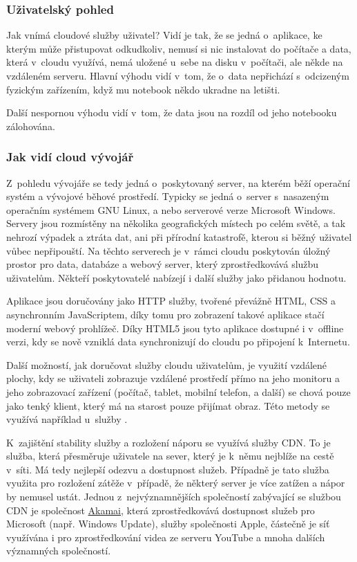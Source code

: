 \subsubsection{Uživatelský pohled}
Jak vnímá cloudové služby uživatel? Vidí je tak, že se jedná o~aplikace, ke kterým může přistupovat odkudkoliv, nemusí si nic instalovat do počítače a data, která v~cloudu využívá, nemá uložené u~sebe na disku v~počítači, ale někde na vzdáleném serveru. Hlavní výhodu vidí v~tom, že o~data nepřichází s~odcizeným fyzickým zařízením, když mu notebook někdo ukradne na letišti.

Další nespornou výhodu vidí v~tom, že data jsou na rozdíl od jeho notebooku zálohována.

\subsubsection{Jak vidí cloud vývojář}
Z~pohledu vývojáře se tedy jedná o~poskytovaný server, na kterém běží operační systém a vývojové běhové prostředí. Typicky se jedná o~server s~nasazeným operačním systémem GNU Linux, a nebo serverové verze Microsoft Windows. Servery jsou rozmístěny na několika geografických místech po celém světě, a tak nehrozí výpadek a ztráta dat, ani při přírodní katastrofě, kterou si běžný uživatel vůbec nepřipouští. Na těchto serverech je v~rámci cloudu poskytován úložný prostor pro data, databáze a webový server, který zprostředkovává službu uživatelům. Někteří poskytovatelé nabízejí i další služby jako přidanou hodnotu.

Aplikace jsou doručovány jako HTTP služby, tvořené převážně HTML, CSS a asynchronním JavaScriptem, díky tomu pro zobrazení takové aplikace stačí moderní webový prohlížeč. Díky HTML5 jsou tyto aplikace dostupné i v~offline verzi, kdy se nově vzniklá data synchronizují do cloudu po připojení k~Internetu.

Další možností, jak doručovat služby cloudu uživatelům, je využití vzdálené plochy, kdy se uživateli zobrazuje vzdálené prostředí přímo na jeho monitoru a jeho zobrazovací zařízení (počítač, tablet, mobilní telefon, a další) se chová pouze jako tenký klient, který má na starost pouze přijímat obraz. Této metody se využívá například u~služby .

K~zajištění stability služby a rozložení náporu se využívá služby CDN. To je služba, která přesměruje uživatele na sever, který je k~němu nejblíže na cestě v~síti. Má tedy nejlepší odezvu a dostupnost služeb. Případně je tato služba využita pro rozložení zátěže v~případě, že některý server je více zatížen a nápor by nemusel ustát. Jednou z~nejvýznamnějších společností zabývající se službou CDN je společnost \href{http://www.akamai.com/}{Akamai}, která zprostředkovává dostupnost služeb pro Microsoft (např. Windows Update), služby společnosti Apple, částečně je síť využívána i pro zprostředkování videa ze serveru YouTube a mnoha dalších významných společností.

